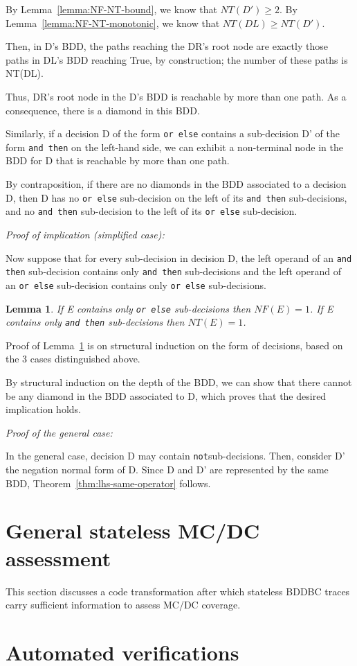 \documentclass[a4paper,12pt,twoside]{article}
\renewcommand{\ge}{\geqslant}
\newcommand{\andthen}{\texttt{and then}}
\newcommand{\orelse}{\texttt{or else}}
\newcommand{\adanot}{\texttt{not}}
\newtheorem{lemma}{Lemma}[subsection]
\begin{document}
By Lemma~\ref{lemma:NF-NT-bound}, we know that $NT(D') \ge 2$. By
Lemma~\ref{lemma:NF-NT-monotonic}, we know that $NT(DL) \ge NT(D')$.

Then, in D's BDD, the paths reaching the DR's root node are exactly
those paths in DL's BDD reaching True, by construction; the number of
these paths is NT(DL).

Thus, DR's root node in the D's BDD is reachable by more than one
path. As a consequence, there is a diamond in this BDD.

Similarly, if a decision D of the form \orelse{} contains a
sub-decision D' of the form \andthen{} on the left-hand side, we can
exhibit a non-terminal node in the BDD for D that is reachable by more
than one path.

By contraposition, if there are no diamonds in the BDD associated to a
decision D, then D has no \orelse{} sub-decision on the left of its
\andthen{} sub-decisions, and no \andthen{} sub-decision to the left of
its \orelse{} sub-decision.

\emph{Proof of implication (simplified case):}

Now suppose that for every sub-decision in decision D, the left
operand of an \andthen{} sub-decision contains only \andthen{}
sub-decisions and the left operand of an \orelse{} sub-decision
contains only \orelse{} sub-decisions.

\begin{lemma}
\label{lemma:NF-NT-only-one-oper}
If E contains only \orelse{} sub-decisions then $NF(E) = 1$.
If E contains only \andthen{} sub-decisions then $NT(E) = 1$.
\end{lemma}

Proof of Lemma~\ref{lemma:NF-NT-only-one-oper} is on structural induction on
the form of decisions, based on the 3 cases distinguished above.

By structural induction on the depth of the BDD, we can show that there cannot
be any diamond in the BDD associated to D, which proves that the desired
implication holds.

\emph{Proof of the general case:}

In the general case, decision D may contain \adanot sub-decisions. Then,
consider D' the negation normal form of D. Since D and D' are represented
by the same BDD, Theorem~\ref{thm:lhs-same-operator} follows.

\section{General stateless MC/DC assessment}

This section discusses a code transformation after which stateless BDDBC
traces carry sufficient information to assess MC/DC coverage.

\section{Automated verifications}

\newpage


\end{document}
